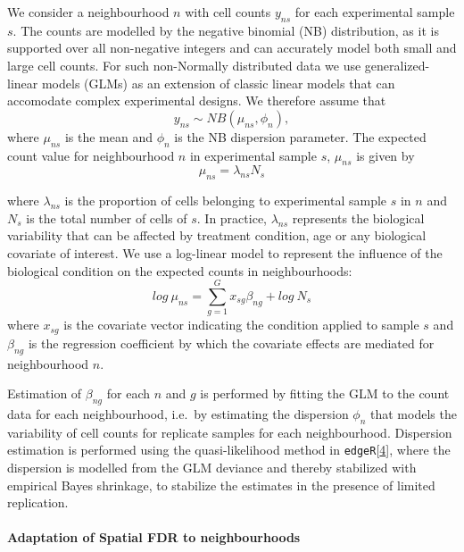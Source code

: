 \documentclass[
]{article}
\begin{document}
We consider a neighbourhood \(n\) with cell counts \(y_{ns}\) for each experimental sample \(s\). The counts are modelled by the negative binomial (NB) distribution, as it is supported over all non-negative integers and can accurately model both small and large cell counts. For such non-Normally distributed data we use generalized-linear models (GLMs) as an extension of classic linear models that can accomodate complex experimental designs. We therefore assume that
\[
y_{ns} \sim NB(\mu_{ns},\phi_{n}),
\]
where \(\mu_{ns}\) is the mean and \(\phi_{n}\) is the NB dispersion parameter.
The expected count value for neighbourhood \(n\) in experimental sample \(s\), \(\mu_{ns}\) is given by
\[
\mu_{ns} = \lambda_{ns}N_s
\]

where \(\lambda_{ns}\) is the proportion of cells belonging to experimental sample \(s\) in \(n\) and \(N_s\) is the total number of cells of \(s\). In practice, \(\lambda_{ns}\) represents the biological variability that can be affected by treatment condition, age or any biological covariate of interest. We use a log-linear model to represent the influence of the biological condition on the expected counts in neighbourhoods:
\[
log\ \mu_{ns} = \sum_{g=1}^{G}x_{sg}\beta_{ng} + log\ N_s
\]
where \(x_{sg}\) is the covariate vector indicating the condition applied to sample \(s\) and \(\beta_{ng}\) is the regression coefficient by which the covariate effects are mediated for neighbourhood \(n\).

Estimation of \(\beta_{ng}\) for each \(n\) and \(g\) is performed by fitting the GLM to the count data for each neighbourhood, i.e.~by estimating the dispersion \(\phi_{n}\) that models the variability of cell counts for replicate samples for each neighbourhood. Dispersion estimation is performed using the quasi-likelihood method in \texttt{edgeR}{[}\protect\hyperlink{ref-robinsonEdgeRBioconductorPackage2010a}{4}{]}, where the dispersion is modelled from the GLM deviance and thereby stabilized with empirical Bayes shrinkage, to stabilize the estimates in the presence of limited replication.

\hypertarget{adaptation-of-spatial-fdr-to-neighbourhoods}{%
\paragraph*{Adaptation of Spatial FDR to neighbourhoods}\label{adaptation-of-spatial-fdr-to-neighbourhoods}}
\end{document}
